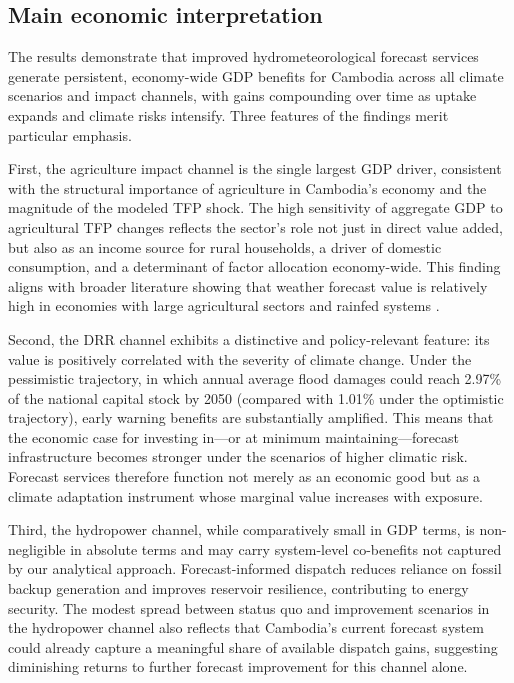 \documentclass[
  final,
  10pt,
  letterpaper,
  english,
]{article}
\begin{document}
\subsection{Main economic interpretation}
\label{sec:discussion_main}

The results demonstrate that improved hydrometeorological forecast services
generate persistent, economy-wide GDP benefits for Cambodia across all climate
scenarios and impact channels, with gains compounding over time as uptake
expands and climate risks intensify. Three features of the findings merit
particular emphasis.

First, the agriculture impact channel is the single largest GDP driver,
consistent with the structural importance of agriculture in Cambodia's economy
and the magnitude of the modeled TFP shock. The high sensitivity of aggregate
GDP to agricultural TFP changes reflects the sector's role not just in direct
value added, but also as an income source for rural households, a driver of
domestic consumption, and a determinant of factor allocation economy-wide. This
finding aligns with broader literature showing that weather forecast value is
relatively high in economies with large agricultural sectors and rainfed systems
\parencite{hansen_potential_2009,an-vo_framework_2021}.

Second, the DRR channel exhibits a distinctive and policy-relevant feature: its
value is positively correlated with the severity of climate change. Under the
pessimistic trajectory, in which annual average flood damages could reach 2.97\%
of the national capital stock by 2050 (compared with 1.01\% under the optimistic
trajectory), early warning benefits are substantially amplified. This means that
the economic case for investing in---or at minimum maintaining---forecast
infrastructure becomes stronger under the scenarios of higher climatic risk.
Forecast services therefore function not merely as an economic good but as a
climate adaptation instrument whose marginal value increases with exposure.

Third, the hydropower channel, while comparatively small in GDP terms, is
non-negligible in absolute terms and may carry system-level co-benefits not
captured by our analytical approach. Forecast-informed dispatch reduces reliance
on fossil backup generation and improves reservoir resilience, contributing to
energy security. The modest spread between status quo and improvement scenarios
in the hydropower channel also reflects that Cambodia's current forecast system
could already capture a meaningful share of available dispatch gains, suggesting
diminishing returns to further forecast improvement for this channel alone.
\end{document}
